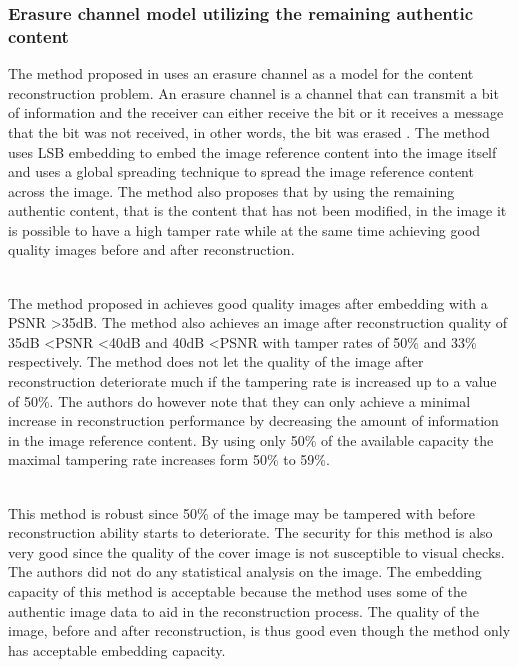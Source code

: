 \documentclass[12pt]{article}
\begin{document}
\subsubsection{Erasure channel model utilizing the remaining authentic content}
\label{ErasureChannelOverview}
The method proposed in \cite {korus2013efficient} uses an erasure channel as a model for the content reconstruction problem.
An erasure channel is a channel that can transmit a bit of information and the receiver can either receive the bit or it receives a message that the bit was not received, in other words, the bit was erased \cite{korus2013efficient}.
The method uses LSB embedding to embed the image reference content into the image itself and uses a global spreading technique to spread the image reference content across the image.
The method also proposes that by using the remaining authentic content, that is the content that has not been modified, in the image it is possible to have a high tamper rate while at the same time achieving good quality images before and after reconstruction.

\hspace{0pt} \\
The method proposed in \cite {korus2013efficient} achieves good quality images after embedding with a PSNR \textgreater 35dB. 
The method also achieves an image after reconstruction quality of 35dB \textless PSNR \textless 40dB and 40dB \textless PSNR with tamper rates of 50\% and 33\% respectively.
The method does not let the quality of the image after reconstruction deteriorate much if the tampering rate is increased up to a value of 50\%.
The authors do however note that they can only achieve a minimal increase in reconstruction performance by decreasing the amount of information in the image reference content.
By using only 50\% of the available capacity the maximal tampering rate increases form 50\% to 59\%.

\hspace{0pt} \\
This method \cite {korus2013efficient} is robust since 50\% of the image may be tampered with before reconstruction ability starts to deteriorate.
The security for this method is also very good since the quality of the cover image is not susceptible to visual checks.
The authors did not do any statistical analysis on the image.
The embedding capacity of this method is acceptable because the method uses some of the authentic image data to aid in the reconstruction process. The quality of the image, before and after reconstruction, is thus good even though the method only has acceptable embedding capacity.  
\end{document}
